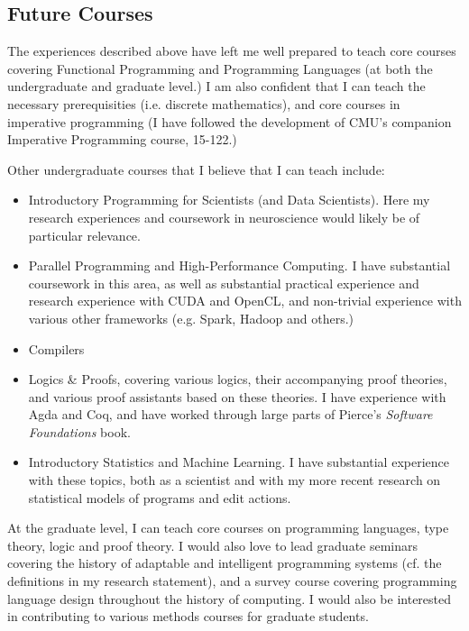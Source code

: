 \documentclass[9pt]{extarticle}
\begin{document}
\subsection*{Future Courses}
The experiences described above have left me well prepared to teach core courses covering Functional Programming and Programming Languages (at both the undergraduate and graduate level.) I am also confident that I can teach the necessary prerequisities (i.e. discrete mathematics), and core courses in imperative programming (I have followed the development of CMU's companion Imperative Programming course, 15-122.) 

Other undergraduate courses that I believe that I can teach include:
\begin{itemize}
\item Introductory Programming for Scientists (and Data Scientists). Here my research experiences and coursework in neuroscience would likely be of particular relevance.
\item Parallel Programming and High-Performance Computing. I have substantial coursework in this area, as well as substantial practical experience and research experience with CUDA and OpenCL, and non-trivial experience with various other frameworks (e.g. Spark, Hadoop and others.)
\item Compilers
\item Logics \& Proofs, covering various logics, their accompanying proof theories, and various proof assistants based on these theories. I have experience with Agda and Coq, and have worked through large parts of Pierce's \emph{Software Foundations} book.
\item Introductory Statistics and Machine Learning. I have substantial experience with these topics, both as a scientist and with my more recent research on statistical models of programs and edit actions.
\end{itemize}

At the graduate level, I can teach core courses on programming languages, type theory, logic and proof theory. I would also love to lead graduate seminars covering the history of adaptable and intelligent programming systems (cf. the definitions in my research statement), and a survey course covering programming language design throughout the history of computing. I would also be interested in contributing to various methods courses for graduate students. 
\end{document}
